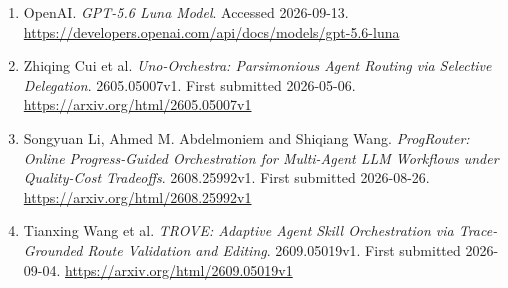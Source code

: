 \begin{enumerate}
\item OpenAI. \textit{GPT-5.6 Luna Model}. Accessed 2026-09-13. \url{https://developers.openai.com/api/docs/models/gpt-5.6-luna}
\item Zhiqing Cui et al. \textit{Uno-Orchestra: Parsimonious Agent Routing via Selective Delegation}. 2605.05007v1. First submitted 2026-05-06. \url{https://arxiv.org/html/2605.05007v1}
\item Songyuan Li, Ahmed M. Abdelmoniem and Shiqiang Wang. \textit{ProgRouter: Online Progress-Guided Orchestration for Multi-Agent LLM Workflows under Quality-Cost Tradeoffs}. 2608.25992v1. First submitted 2026-08-26. \url{https://arxiv.org/html/2608.25992v1}
\item Tianxing Wang et al. \textit{TROVE: Adaptive Agent Skill Orchestration via Trace-Grounded Route Validation and Editing}. 2609.05019v1. First submitted 2026-09-04. \url{https://arxiv.org/html/2609.05019v1}
\end{enumerate}
\endgroup
